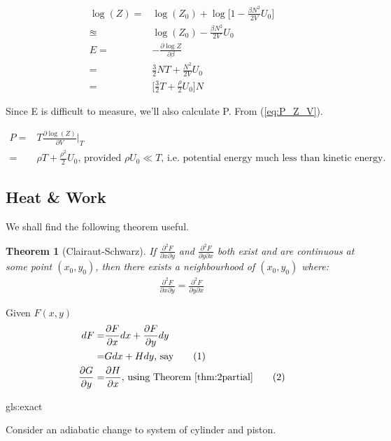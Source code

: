 \documentclass[]{article}
\newcommand\numberthis{\addtocounter{equation}{1}\tag{\theequation}}
\newtheorem{thm}{Theorem}
\begin{document}
\begin{align*}
\log(Z) =& \log(Z_0) + \log\Big[1 - \frac{\beta N^2}{2V} U_0\Big] \\
\approxeq & \log(Z_0) - \frac{\beta N^2}{2V} U_0\\
E =& - \frac{\partial \log Z}{\partial \beta}\\
=& \frac{3}{2}NT + \frac{N^2}{2V}U_0\\
=& \Big[\frac{3}{2}T + \frac{ \rho}{2}U_0\Big] N
\end{align*}

Since E is difficult to measure, we'll also calculate P. From (\ref{eq:P_Z_V}).

\begin{align*}
P =& T \frac{\partial \log(Z)}{\partial V}\bigg|_T\\
=& \rho T + \frac{\rho^2}{2} U_0\text{, provided $\rho U_0 \ll T$, i.e. potential energy much less than kinetic energy.}
\end{align*}

\subsection{Heat \& Work}

We shall find the following theorem useful.

\begin{thm}[Clairaut-Schwarz]\label{thm:2partial}
	If $\frac{\partial^2 F}{\partial x \partial y}$ and $\frac{\partial^2 F}{\partial y \partial x}$ both exist and are continuous at some point $(x_0,y_0)$, then there exists a neighbourhood of $(x_0,y_0)$ where:
	\begin{align*}
	\frac{\partial^2 F}{\partial x \partial y} = \frac{\partial^2 F}{\partial y \partial x}
	\end{align*}
\end{thm}


Given $F(x,y)$
\begin{align*}
dF =& \frac{\partial F}{\partial x}dx + \frac{\partial F}{\partial y}dy\\
=& G dx + H dy\text{, say}\numberthis \label{eq:dF}\\
\frac{\partial G}{\partial y} =& \frac{\partial H}{\partial x}\text{, using Theorem \ref{thm:2partial}}\numberthis \label{eq:exact}
\end{align*}

\glsdesc{gls:exact}

 
Consider an adiabatic change to system of cylinder and piston.
\end{document}
